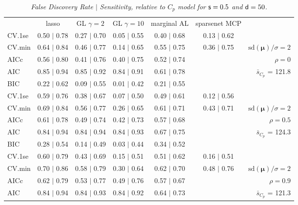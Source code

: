\documentclass[12pt]{article}
\newcommand{\mr}[1]{\mathrm{#1}}
\newcommand{\bm}[1]{\mathbf{#1}}
\begin{document}
\begin{table}[p]\vspace{-.5cm}
\caption[l]{\label{sens}\it False Discovery Rate $\mid$ Sensitivity, relative to $C_p$ model  for ${\sf s}=0.5$ and ${\sf d}=50$.}
\vspace{-.5cm}
\small{}
\begin{center}
\begin{tabular}{l*{5}{c}|r}
 & lasso & GL $\gamma=2$ & GL $\gamma=10$ & marginal AL & sparsenet MCP  & \\
 \cline{1-7}
CV.1se & 0.50 $\mid$ 0.78 & 0.27 $\mid$ 0.70 & 0.05 $\mid$ 0.55 & 0.40 $\mid$ 0.68 & 0.13 $\mid$ 0.62 &\\
CV.min & 0.64 $\mid$ 0.84 & 0.46 $\mid$ 0.77 & 0.14 $\mid$ 0.65 & 0.55 $\mid$ 0.75 & 0.36 $\mid$ 0.75 &  $\mr{sd}(\bm{\mu})/\sigma=2$ \\
AICc & 0.56 $\mid$ 0.80 & 0.41 $\mid$ 0.76 & 0.40 $\mid$ 0.75 & 0.52 $\mid$ 0.74 & & $\rho=0$ \\
AIC & 0.85 $\mid$ 0.94 & 0.85 $\mid$ 0.92 & 0.84 $\mid$ 0.91 & 0.61 $\mid$ 0.78 & & \multirow{2}{*}{$\bar{s}_{C_p}$ = 121.8} \\
BIC & 0.22 $\mid$ 0.62 & 0.09 $\mid$ 0.55 & 0.01 $\mid$ 0.42 & 0.21 $\mid$ 0.55 & & \\
 \hline 
CV.1se & 0.59 $\mid$ 0.76 & 0.38 $\mid$ 0.67 & 0.07 $\mid$ 0.50 & 0.49 $\mid$ 0.61 & 0.12 $\mid$ 0.56 &\\
CV.min & 0.69 $\mid$ 0.84 & 0.56 $\mid$ 0.77 & 0.26 $\mid$ 0.65 & 0.61 $\mid$ 0.71 & 0.43 $\mid$ 0.71 &  $\mr{sd}(\bm{\mu})/\sigma=2$ \\
AICc & 0.61 $\mid$ 0.78 & 0.49 $\mid$ 0.74 & 0.42 $\mid$ 0.73 & 0.57 $\mid$ 0.68 & & $\rho=0.5$ \\
AIC & 0.84 $\mid$ 0.94 & 0.84 $\mid$ 0.94 & 0.84 $\mid$ 0.93 & 0.67 $\mid$ 0.75 & & \multirow{2}{*}{$\bar{s}_{C_p}$ = 124.3} \\
BIC & 0.28 $\mid$ 0.54 & 0.14 $\mid$ 0.49 & 0.03 $\mid$ 0.44 & 0.34 $\mid$ 0.52 & & \\
 \hline 
CV.1se & 0.60 $\mid$ 0.79 & 0.43 $\mid$ 0.69 & 0.15 $\mid$ 0.51 & 0.51 $\mid$ 0.62 & 0.16 $\mid$ 0.51 &\\
CV.min & 0.70 $\mid$ 0.86 & 0.58 $\mid$ 0.79 & 0.30 $\mid$ 0.64 & 0.62 $\mid$ 0.70 & 0.48 $\mid$ 0.76 &  $\mr{sd}(\bm{\mu})/\sigma=2$ \\
AICc & 0.62 $\mid$ 0.79 & 0.53 $\mid$ 0.77 & 0.49 $\mid$ 0.76 & 0.57 $\mid$ 0.67 & & $\rho=0.9$ \\
AIC & 0.84 $\mid$ 0.94 & 0.84 $\mid$ 0.93 & 0.84 $\mid$ 0.92 & 0.64 $\mid$ 0.73 & & \multirow{2}{*}{$\bar{s}_{C_p}$ = 121.3} \\

\end{tabular}
\end{center}
\end{table}
\end{document}
